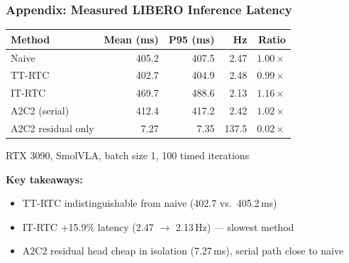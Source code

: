 \documentclass[aspectratio=1610]{beamer}
\begin{document}
\begin{frame}
\frametitle{Appendix: Measured LIBERO Inference Latency}

\begin{table}
\centering
\small
\begin{tabular}{l r r r r}
\toprule
\textbf{Method} & \textbf{Mean (ms)} & \textbf{P95 (ms)} & \textbf{Hz} & \textbf{Ratio} \\
\midrule
Naive & 405.2 & 407.5 & 2.47 & $1.00\times$ \\
TT-RTC & 402.7 & 404.9 & 2.48 & $0.99\times$ \\
IT-RTC & 469.7 & 488.6 & 2.13 & $1.16\times$ \\
A2C2 (serial) & 412.4 & 417.2 & 2.42 & $1.02\times$ \\
A2C2 residual only & 7.27 & 7.35 & 137.5 & $0.02\times$ \\
\bottomrule
\end{tabular}
\end{table}

\small RTX 3090, SmolVLA, batch size 1, 100 timed iterations

\vspace{0.3em}
\textbf{Key takeaways:}
\begin{itemize}
    \item TT-RTC indistinguishable from naive (402.7 vs.\ 405.2\,ms)
    \item IT-RTC +15.9\% latency (2.47 $\rightarrow$ 2.13\,Hz) --- slowest method
    \item A2C2 residual head cheap in isolation (7.27\,ms), serial path close to naive
\end{itemize}

\end{frame}
\end{document}
